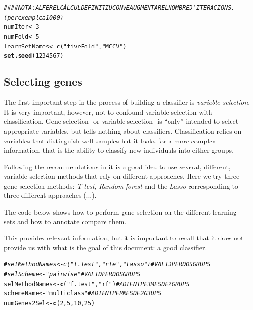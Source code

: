 \documentclass{article}\usepackage[]{graphicx}\usepackage[]{color}
\makeatletter
\newcommand{\hlnum}[1]{\textcolor[rgb]{0.686,0.059,0.569}{#1}}%
\newcommand{\hlstr}[1]{\textcolor[rgb]{0.192,0.494,0.8}{#1}}%
\newcommand{\hlcom}[1]{\textcolor[rgb]{0.678,0.584,0.686}{\textit{#1}}}%
\newcommand{\hlstd}[1]{\textcolor[rgb]{0.345,0.345,0.345}{#1}}%
\newcommand{\hlkwb}[1]{\textcolor[rgb]{0.69,0.353,0.396}{#1}}%
\newcommand{\hlkwd}[1]{\textcolor[rgb]{0.737,0.353,0.396}{\textbf{#1}}}%
\newenvironment{kframe}{%
 \def\at@end@of@kframe{}%
 \ifinner\ifhmode%
  \def\at@end@of@kframe{\end{minipage}}%
  \begin{minipage}{\columnwidth}%
 \fi\fi%
 \def\FrameCommand##1{\hskip\@totalleftmargin \hskip-\fboxsep
 \colorbox{shadecolor}{##1}\hskip-\fboxsep
     \hskip-\linewidth \hskip-\@totalleftmargin \hskip\columnwidth}%
 \MakeFramed {\advance\hsize-\width
   \@totalleftmargin\z@ \linewidth\hsize
   \@setminipage}}%
 {\par\unskip\endMakeFramed%
 \at@end@of@kframe}
\newenvironment{knitrout}{}{} %
\makeatother
\begin{document}
\begin{knitrout}
\color{fgcolor}\begin{kframe}
\begin{alltt}
\hlcom{#### NOTA: AL FER EL CÀLCUL DEFINITIU CONVE AUGMENTAR EL NOMBRE D'ITERACIONS. (per exemple a 1000)}
\hlstd{numIter} \hlkwb{<-} \hlnum{3}
\hlstd{numFold} \hlkwb{<-} \hlnum{5}
\hlstd{learnSetNames} \hlkwb{<-} \hlkwd{c}\hlstd{(}\hlstr{"fiveFold"}\hlstd{,} \hlstr{"MCCV"}\hlstd{)}
\hlkwd{set.seed}\hlstd{(}\hlnum{1234567}\hlstd{)}
\end{alltt}
\end{kframe}
\end{knitrout}




\subsection{Selecting genes}

The first important step in the process of building a classifier is \emph{variable selection}. It is very important, however, not to confound variable selection with classification. Gene selection -or variable selection- is ``only'' intended to select appropriate variables, but tells nothing about classifiers. Classification relies on variables that distinguish well samples but it looks for a more complex information, that is the ability to classify new individuals into either groups.

Following the recommendations in \cite{Boulesteix:2010} it is a good idea to use several, different, variable selection methods that rely on different approaches, Here we try three  gene selection methods: \emph{T-test}, \emph{Random forest} and the \emph{Lasso} corresponding to three different approaches (...).

The code below shows how to perform gene selection on the different learning sets and how to annotate compare them.

This provides relevant information, but it is important to recall that it does not provide us with what is the goal of this document: a good classifier.

\begin{knitrout}
\color{fgcolor}\begin{kframe}
\begin{alltt}
\hlcom{# selMethodNames <- c("t.test", "rfe", "lasso") # VALID PER DOS GRUPS}
\hlcom{# selScheme <- "pairwise"                       # VALID PER DOS GRUPS}
\hlstd{selMethodNames} \hlkwb{<-} \hlkwd{c}\hlstd{(}\hlstr{"f.test"}\hlstd{,} \hlstr{"rf"}\hlstd{)}           \hlcom{# ADIENT PER MES DE 2 GRUPS}
\hlstd{schemeName} \hlkwb{<-} \hlstr{"multiclass"}                     \hlcom{# ADIENT PER MES DE 2 GRUPS}
\hlstd{numGenes2Sel} \hlkwb{<-} \hlkwd{c}\hlstd{(}\hlnum{2}\hlstd{,}\hlnum{5}\hlstd{,}\hlnum{10}\hlstd{,} \hlnum{25}\hlstd{)}
\end{alltt}
\end{kframe}
\end{knitrout}
\end{document}
